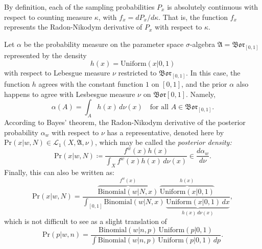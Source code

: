 \documentclass[
twoside=true,
paper=letter,
fontsize=11pt,
pagesize=auto,
leqno,
openany,
headsepline,
overfullrule,
]{scrbook}
\theoremstyle{plain}
\theoremstyle{plain}
\theoremstyle{definition}
\theoremstyle{bfnoteitalic}
\theoremstyle{bfnoteroman}
\newcommand{\sigalg}[1]{\mathfrak{#1}}
\newcommand{\cali}[1]{\mathscr{#1}}
\newcommand{\definedby}{\coloneqq}
\newcommand{\borel}{\mathfrak{Bor}}
\newcommand{\textsigma}{\hbox{\large{$\sigma$}}\kern-1pt}
\newcommand{\function}{f}
\newcommand{\functioniii}{h}
\newcommand{\measurespace}{X}
\newcommand{\measureii}{\nu}
\newcommand{\seti}{A}
\newcommand{\pspace}{\measurespace}%
\newcommand{\pspaceelt}{x}
\newcommand{\pspacesig}{\sigalg{A}}
\newcommand{\marginalone}{\alpha}%
\newcommand{\prior}{\marginalone}
\begin{document}
By definition, each of the sampling probabilities $P_\pspaceelt$ is absolutely continuous with respect to counting measure $\kappa$, with
$\function_\pspaceelt = d P_\pspaceelt/ d \kappa$. That is, the function $\function_\pspaceelt$ represents the Radon-Nikodym derivative of $P_\pspaceelt$ with respect to  $\kappa$.


Let $\prior$ be the probability measure on the parameter space \textsigma-algebra  
$\pspacesig = \borel_{[0,1]}$ represented by the density 
\[
\functioniii(\pspaceelt) = \text{Uniform}(\pspaceelt\vert 0,1)
\]
with respect to Lebesgue measure $\measureii$ restricted to $\borel_{[0,1]}$.
In this case, the function $\functioniii$ agrees with the constant function $1$ on  $[0,1]$,
and the prior $\prior$ also happens to agree with Lesbesgue measure $\measureii$ on $\borel{[0,1]}$. Namely,
\[
\prior(\seti) = \int_\seti \functioniii(\pspaceelt)\,d \measureii(\pspaceelt)
\quad\text{for all $\seti\in\borel_{[0,1]}$}.
\]
According to Bayes' theorem, the Radon-Nikodym derivative of the posterior probability $\prior_w$ with respect to $\measureii$ has a representative, denoted here by
$\text{Pr}(\pspaceelt\vert w,N) \in \cali{L}_1(\pspace,\pspacesig,\measureii)$, which may be called the
\emph{posterior density:}
\[
\text{Pr}(\pspaceelt\vert w,N) \definedby
\dfrac
{\function^w(\pspaceelt)\functioniii(\pspaceelt)}
{\int_{\pspace} \function^w(\pspaceelt)\functioniii(\pspaceelt)
\,d\measureii(\pspaceelt)}
\in
\frac{d\prior_w}{d\measureii}.
\]
Finally, this can also be written as:
\[
\text{Pr}(\pspaceelt\vert w,N)
=
\dfrac{
\overbrace{\text{Binomial}(w\vert N,\pspaceelt)}^{\function^w(\pspaceelt)}\,
\overbrace{\text{Uniform}(\pspaceelt\vert 0,1)}^{h(\pspaceelt)}
}
{\int_{[0,1]} \text{Binomial}(w\vert N,\pspaceelt)\,
\underbrace{\text{Uniform}(\pspaceelt\vert 0,1)\, d\pspaceelt}_{\functioniii(\pspaceelt)\,d\measureii(\pspaceelt)}},
\]
which is not difficult to see as a slight translation of
\[
\text{Pr}(p\vert w,n)
=
\frac{\text{Binomial}(w\vert n,p)\,\text{Uniform}(p\vert 0,1)}
{\int \text{Binomial}(w\vert n,p)\,\text{Uniform}(p\vert 0,1)\, dp}.
\]


\end{document}
